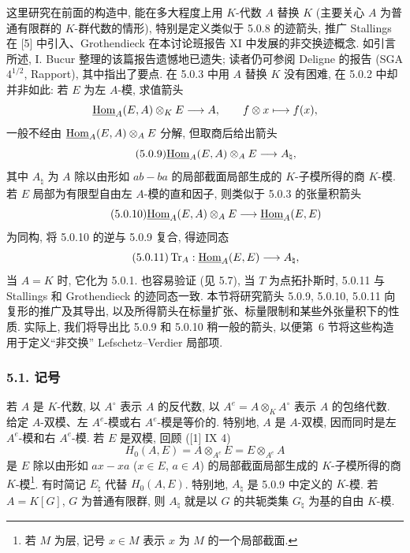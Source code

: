 这里研究在前面的构造中, 能在多大程度上用 $K$-代数 $A$ 替换 $K$ (主要关心 $A$ 为普通有限群的 $K$-群代数的情形), 特别是定义类似于 5.0.8 的迹箭头, 推广 Stallings 在 [5] 中引入、Grothendieck 在本讨论班报告 XI 中发展的非交换迹概念. 如引言所述, I. Bucur 整理的该篇报告遗憾地已遗失; 读者仍可参阅 Deligne 的报告 (SGA $4^{1/2}$, Rapport), 其中指出了要点. 在 5.0.3 中用 $A$ 替换 $K$ 没有困难, 在 5.0.2 中却并非如此: 若 $E$ 为左 $A$-模, 求值箭头
\[
\underline{\operatorname{Hom}}_A(E,A)\otimes_KE\longrightarrow A,
\qquad f\otimes x\longmapsto f(x),
\]
一般不经由 $\underline{\operatorname{Hom}}_A(E,A)\otimes_AE$ 分解, 但取商后给出箭头
\begin{equation}\tag{5.0.9}
\underline{\operatorname{Hom}}_A(E,A)\otimes_AE\longrightarrow A_\natural,
\end{equation}
其中 $A_\natural$ 为 $A$ 除以由形如 $ab-ba$ 的局部截面局部生成的 $K$-子模所得的商 $K$-模. 若 $E$ 局部为有限型自由左 $A$-模的直和因子, 则类似于 5.0.3 的张量积箭头
\begin{equation}\tag{5.0.10}
\underline{\operatorname{Hom}}_A(E,A)\otimes_AE\longrightarrow\underline{\operatorname{Hom}}_A(E,E)
\end{equation}
为同构, 将 5.0.10 的逆与 5.0.9 复合, 得迹同态
\begin{equation}\tag{5.0.11}
\operatorname{Tr}_A:\underline{\operatorname{Hom}}_A(E,E)\longrightarrow A_\natural,
\end{equation}
当 $A=K$ 时, 它化为 5.0.1. 也容易验证 (见 5.7), 当 $T$ 为点拓扑斯时, 5.0.11 与 Stallings 和 Grothendieck 的迹同态一致. 本节将研究箭头 5.0.9, 5.0.10, 5.0.11 向复形的推广及其导出, 以及所得箭头在标量扩张、标量限制和某些外张量积下的性质. 实际上, 我们将导出比 5.0.9 和 5.0.10 稍一般的箭头, 以便第~6 节将这些构造用于定义``非交换'' Lefschetz--Verdier 局部项.

\subsubsection*{5.1. 记号}

若 $A$ 是 $K$-代数, 以 $A^\circ$ 表示 $A$ 的反代数, 以 $A^e=A\otimes_KA^\circ$ 表示 $A$ 的包络代数. 给定 $A$-双模、左 $A^e$-模或右 $A^e$-模是等价的. 特别地, $A$ 是 $A$-双模, 因而同时是左 $A^e$-模和右 $A^e$-模. 若 $E$ 是双模, 回顾 ([1] IX 4)
\[
H_0(A,E)=A\otimes_{A^e}E=E\otimes_{A^e}A
\]
是 $E$ 除以由形如 $ax-xa$ ($x\in E$, $a\in A$) 的局部截面局部生成的 $K$-子模所得的商 $K$-模\footnote{若 $M$ 为层, 记号 $x\in M$ 表示 $x$ 为 $M$ 的一个局部截面.}. 有时简记 $E_\natural$ 代替 $H_0(A,E)$. 特别地, $A_\natural$ 是 5.0.9 中定义的 $K$-模. 若 $A=K[G]$, $G$ 为普通有限群, 则 $A_\natural$ 就是以 $G$ 的共轭类集 $G_\natural$ 为基的自由 $K$-模.

